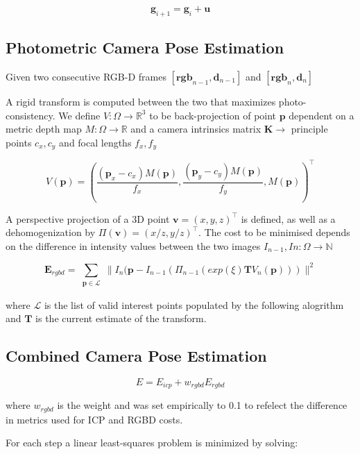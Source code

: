\documentclass[10pt,twocolumn]{article}
\begin{document}
$$
\mathbf{g}_{i+1} = \mathbf{g}_{i} + \mathbf{u}
$$



\subsection{Photometric Camera Pose Estimation}
Given two consecutive RGB-D frames $[\mathbf{rgb}_{n-1}, \mathbf{d}_{n-1}]$ and $[\mathbf{rgb}_{n}, \mathbf{d}_{n}]$

A rigid transform is computed between the two that maximizes photo-consistency. 
We define $V: \Omega \rightarrow \mathbb{R}^{3}$ to be back-projection of point $\mathbf{p}$ dependent on
a metric depth map $M: \Omega \rightarrow \mathbb{R}$ and
a camera intrinsics matrix $\mathbf{K} \rightarrow$ principle points $c_{x}, c_{y}$ and focal lengths $f_{x}, f_{y}$ 

$$
V(\mathbf{p}) = \left( \frac{(\mathbf{p}_{x} - c_{x})M(\mathbf{p})}{f_{x}}, \frac{(\mathbf{p}_{y} - c_{y})M(\mathbf{p})}{f_{y}}, M(\mathbf{p}) \right)^{\top}
$$

A perspective projection of a 3D point $\mathbf{v} = (x,y,z)^{\top}$ is defined, as well as a dehomogenization by $\Pi(\mathbf{v}) = (x/z, y/z)^{\top}$. The cost to be minimised depends on the difference in intensity values between the two images $I_{n-1}, I{n}: \Omega \rightarrow \mathbb{N}$

$$
\mathbf{E}_{rgbd} = 
\sum_{\substack{
   \mathbf{p} \in \mathcal{L} 
  }}
  \| I_{n}(\mathbf{p} - I_{n-1}(\Pi_{n-1}(exp(\xi)\mathbf{T}V_{n}(\mathbf{p})))  \|^{2}
$$

where $\mathcal{L}$ is the list of valid interest points populated by the following alogrithm and $\mathbf{T}$ is the current estimate of the transform.

\subsection{Combined Camera Pose Estimation}

$$
E = E_{icp} + w_{rgbd}E_{rgbd}
$$

where $w_{rgbd}$ is the weight and was set empirically to 0.1 to refelect the difference in metrics used for ICP and RGBD costs.

For each step a linear least-squares problem  is minimized by solving:
$$
$$






\end{document}
